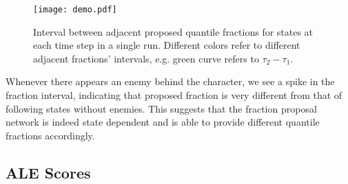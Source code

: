 \documentclass{article}
\begin{document}
\begin{figure*}[htb!]
    \centering
    \texttt{[image: demo.pdf]}
    \caption{Interval between adjacent proposed quantile fractions for states at each time step in a single run. Different colors refer to different adjacent fractions' intervals, e.g. green curve refers to $\tau_2-\tau_1$.}
    \label{demo}
\end{figure*}

Whenever there appears an enemy behind the character, we see a spike in the fraction interval, indicating that proposed fraction is very different from that of following states without enemies. This suggests that the fraction proposal network is indeed state dependent and is able to provide different quantile fractions accordingly.

\newpage
\subsection*{ALE Scores}
\end{document}
